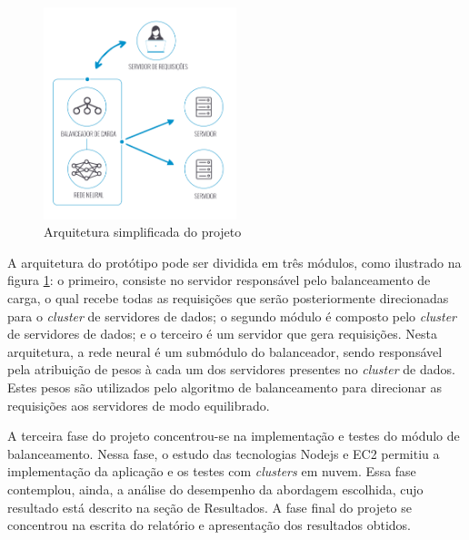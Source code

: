 \begin{figure}[htb]
	\caption{\label{fig:arq}Arquitetura simplificada do projeto}
	\begin{center}
		\includegraphics[width=0.50\textwidth]{img/projeto.png}
	\end{center}
\end{figure}

A arquitetura do protótipo pode ser dividida em três módulos, como ilustrado na figura \ref{fig:arq}: o primeiro, consiste no servidor responsável pelo balanceamento de carga, o qual recebe todas as requisições que serão posteriormente direcionadas para o \textit{cluster} de servidores de dados; o segundo módulo é composto pelo \textit{cluster} de servidores de dados; e o terceiro é um servidor que gera requisições. Nesta arquitetura, a rede neural é um submódulo do balanceador, sendo responsável pela atribuição de pesos à cada um dos servidores presentes no \textit{cluster} de dados. Estes pesos são utilizados pelo algoritmo de balanceamento para direcionar as requisições aos servidores de modo equilibrado. 

A terceira fase do projeto concentrou-se na implementação e testes do módulo de balanceamento. Nessa fase, o estudo das tecnologias Nodejs e EC2 permitiu a implementação da aplicação e os testes com \textit{clusters} em nuvem.  Essa fase contemplou, ainda, a análise do desempenho da abordagem escolhida, cujo resultado está descrito na seção de Resultados. A fase final do projeto se concentrou na escrita do relatório e apresentação dos resultados obtidos. 
